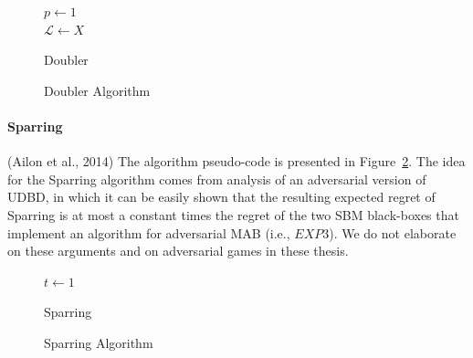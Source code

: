 \documentclass[MSc,beforeExam]{iitcsthesis}
\begin{document}
	\begin{figure}[h]
	\IncMargin{1em}
		\begin{algorithm}[H]
		
		\BlankLine
		$p\leftarrow 1$\\
		$ \mathcal{L} \leftarrow X$\\
			\caption{Doubler}
		\end{algorithm}
		\caption{Doubler Algorithm}\label{algo_Doubler}
	\end{figure}
\newpage
\paragraph{Sparring}
	(Ailon et al., 2014)\cite{ailon2014reducing} The algorithm pseudo-code is presented in Figure~\ref{algo_Sparring}.
	The idea for the Sparring algorithm comes from analysis of an adversarial version of UDBD, in which it can be easily shown that the resulting expected regret of Sparring is at most a constant times the regret of the two SBM black-boxes that implement an algorithm for adversarial MAB (i.e., $EXP3$).  We do not elaborate on these arguments and on adversarial
	games in these thesis.
		
		\begin{figure}[h]
	\IncMargin{1em}
		\begin{algorithm}[H]
		\BlankLine
		$t\leftarrow 1 $\\
			\caption{Sparring}
		\end{algorithm}
		\caption{Sparring Algorithm}\label{algo_Sparring}
	\end{figure}
	
\end{document}
